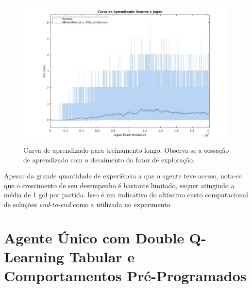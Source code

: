 \begin{figure}[h]
	\includegraphics[width=0.8\linewidth]{figs/curvalonga-qtabular.jpg}
	\centering
	\caption{Curva de aprendizado para treinamento longo. Observa-se a cessação de aprendizado com o decaimento do fator de exploração.}
	\label{fig:single-agent-curvalonga}
\end{figure}

Apesar da grande quantidade de experiência a que o agente teve acesso, nota-se que o crescimento de seu desempenho é bastante limitado, sequer atingindo a média de 1 gol por partida. Isso é um indicativo do altíssimo custo computacional de soluções \textit{end-to-end} como a utilizada no experimento.

\section{Agente Único com Double Q-Learning Tabular e Comportamentos Pré-Programados}






